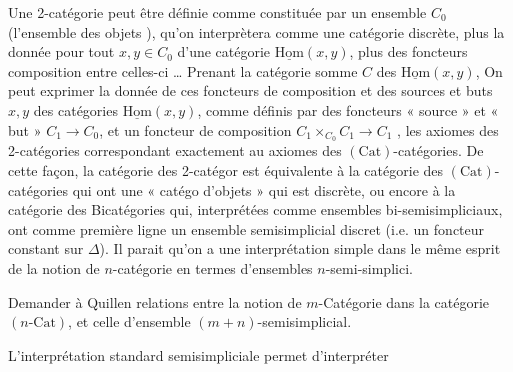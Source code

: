 \documentclass[11pt,a4paper]{article}
\begin{document}
Une 2-catégorie peut être définie comme constituée par un ensemble $C_{0}$
(l'ensemble des objets ), qu'on interprètera comme une catégorie discrète,
plus la donnée pour tout $x, y \in C_{0}$ d'une catégorie
$\underline{\mathrm{Hom}}(x, y)$, plus des foncteurs composition entre
celles-ci … Prenant la catégorie somme $C$ des
$\underline{\mathrm{Hom}}(x, y)$, On peut exprimer la donnée de ces foncteurs
de composition et des sources et buts $x, y$ des catégories
$\underline{\mathrm{Hom}}(x, y)$, comme définis par des foncteurs « source »
et « but » $C_{1} \to C_{0}$, et un foncteur de composition
$C_{1} \times_{C_{0}} C_{1} \to C_{1}$ , les axiomes des 2-catégories
correspondant exactement au axiomes des $(\mathrm{Cat})$-catégories. De
cette façon, la catégorie des 2-catégor est équivalente à la
catégorie des $(\mathrm{Cat})$-catégories qui ont une « catégo
d'objets » qui est discrète, ou encore à la catégorie des Bicatégories qui,
interprétées comme ensembles bi-semisimpliciaux, ont comme première ligne un
ensemble semisimplicial discret (i.e. un foncteur constant sur $\Delta$). Il
parait qu'on a une interprétation simple dans le même esprit de la notion de
$n$-catégorie en termes d'ensembles $n$-semi-simplici.

Demander à Quillen relations entre la notion de $m$-Catégorie dans la
catégorie $(n\text{-Cat})$, et celle d'ensemble $(m+n)$-semisimplicial.

L'interprétation standard semisimpliciale permet d'interpréter

\end{document}
